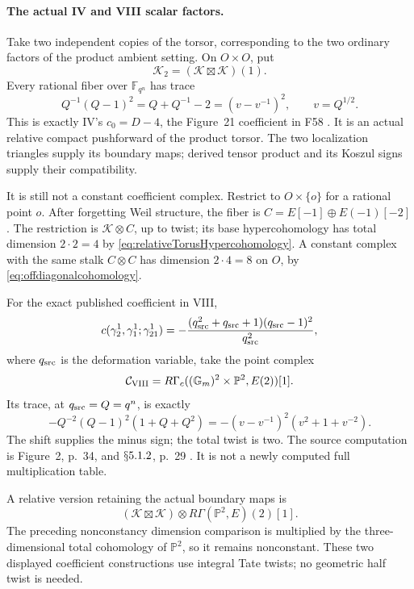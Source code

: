 \documentclass[11pt,a4paper]{article}
\renewcommand{\S}{\ensuremath{\mathsection}}
\newcommand{\fid}[1]{\textsf{#1}}\newcommand{\gate}[1]{\textsf{#1}}
\theoremstyle{named}\newtheorem{finding}{Finding}[section]
\theoremstyle{definition}\newtheorem{definition}[finding]{Definition}
\theoremstyle{remark}\newtheorem{remark}[finding]{Remark}
\begin{document}
\paragraph{The actual IV and VIII scalar factors.}
Take two independent copies of the torsor, corresponding to
the two ordinary factors of the product ambient setting.
On \(O\times O\), put
\[
                   \mathcal K_2=(\mathcal K\boxtimes\mathcal K)(1).
\]
Every rational fiber over \(\mathbb F_{q^n}\) has trace
\begin{equation}\label{eq:relativeczerotrace}
 Q^{-1}(Q-1)^2=Q+Q^{-1}-2
             =(v-v^{-1})^2,\qquad v=Q^{1/2}.
\end{equation}
This is exactly IV's \(c_0=D-4\), the Figure~21 coefficient
in \fid{F58} \cite[Example~19.3, pp.~133--135]{IV}.
It is an actual relative compact pushforward of the product
torsor. The two localization triangles supply its boundary
maps; derived tensor product and its Koszul signs supply
their compatibility.

It is still not a constant coefficient complex.
Restrict to \(O\times\{o\}\) for a rational point \(o\).
After forgetting Weil structure, the fiber is
\(C=E[-1]\oplus E(-1)[-2]\).
The restriction is \(\mathcal K\otimes C\), up to twist;
its base hypercohomology has total dimension \(2\cdot2=4\)
by \eqref{eq:relativeTorusHypercohomology}.
A constant complex with the same stalk \(C\otimes C\)
has dimension \(2\cdot4=8\) on \(O\), by
\eqref{eq:offdiagonalcohomology}.

For the exact published coefficient in VIII,
\[
 c(\gamma_2^1,\gamma_1^1;\gamma_{21}^1)
   =-\frac{(q_{\rm src}^2+q_{\rm src}+1)(q_{\rm src}-1)^2}
           {q_{\rm src}^2},
\]
where \(q_{\rm src}\) is the deformation variable,
take the point complex
\begin{equation}\label{eq:VIIIgeometriccoefficient}
 \mathcal C_{\rm VIII}
   =R\Gamma_c((\mathbb G_m)^2\times\mathbb P^2,E(2))[1].
\end{equation}
Its trace, at \(q_{\rm src}=Q=q^n\), is exactly
\[
 -Q^{-2}(Q-1)^2(1+Q+Q^2)
       =-(v-v^{-1})^2(v^2+1+v^{-2}).
\]
The shift supplies the minus sign; the total twist is two.
The source computation is Figure~2, p.~34, and
\(\S5.1.2\), p.~29 \cite{VIII}.
It is not a newly computed full multiplication table.

A relative version retaining the actual boundary maps is
\[
 (\mathcal K\boxtimes\mathcal K)\otimes
                   R\Gamma(\mathbb P^2,E)(2)[1].
\]
The preceding nonconstancy dimension comparison is multiplied
by the three-dimensional total cohomology of \(\mathbb P^2\),
so it remains nonconstant. These two displayed coefficient
constructions use integral Tate twists; no geometric half
twist is needed.
\end{document}
